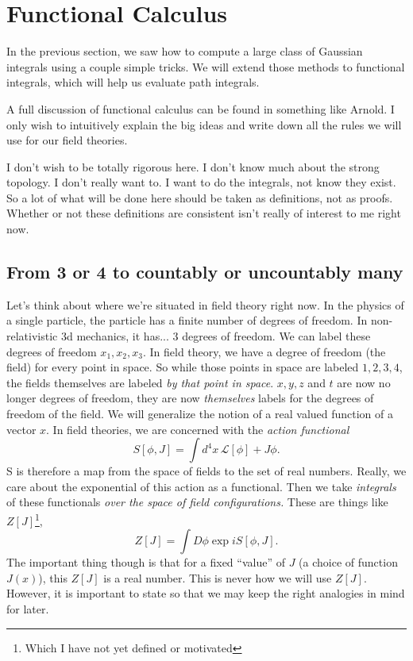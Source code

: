 \documentclass[main.tex]{subfiles}
\begin{document}
\chapter{Functional Calculus}
In the previous section, we saw how to compute a large class of Gaussian integrals using a couple simple tricks. We will extend those methods to functional integrals, which will help us evaluate path integrals.

A full discussion of functional calculus can be found in something like Arnold. I only wish to intuitively explain the big ideas and write down all the rules we will use for our field theories.

I don't wish to be totally rigorous here. I don't know much about the strong topology. I don't really want to. I want to do the integrals, not know they exist. So a lot of what will be done here should be taken as definitions, not as proofs. Whether or not these definitions are consistent isn't really of interest to me right now. 

\section{From 3 or 4 to countably or uncountably many}
Let's think about where we're situated in field theory right now. In the physics of a single particle, the particle has a finite number of degrees of freedom. In non-relativistic 3d mechanics, it has... 3 degrees of freedom. We can label these degrees of freedom $x_1,x_2,x_3$. In field theory, we have a degree of freedom (the field) for every point in space. So while those points in space are labeled $1,2,3,4$, the fields themselves are labeled \textit{by that point in space}. $x,y,z$ and $t$ are now no longer degrees of freedom, they are now \textit{themselves} labels for the degrees of freedom of the field. 
We will generalize the notion of a real valued function of a vector $x$. In field theories, we are concerned with the \textit{action functional}
\[
S[\phi,J] = \int d^4 x \, \mathcal{L} [\phi] + J \phi.
\]
S is therefore a map from the space of fields to the set of real numbers. Really, we care about the exponential of this action as a functional. Then we take \textit{integrals} of these functionals \textit{over the space of field configurations.} These are things like $Z[J]$\footnote{Which I have not yet defined or motivated},
\[
Z[J] = \int D \phi \exp{i S[\phi,J]}.
\]
The important thing though is that for a fixed ``value'' of $J$ (a choice of function $J(x)$), this $Z[J]$ is a real number. This is never how we will use $Z[J]$. However, it is important to state so that we may keep the right analogies in mind for later. 
\newpage
\end{document}
